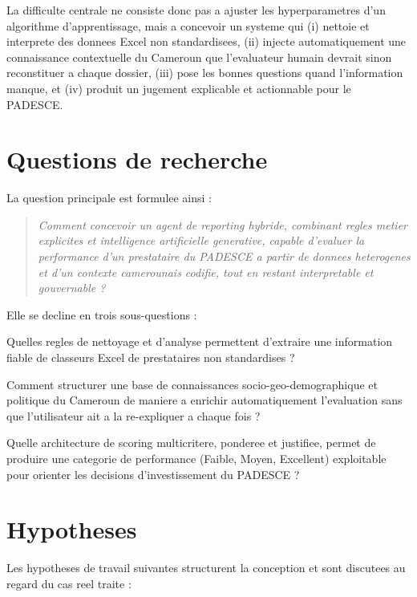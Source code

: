 \documentclass[12pt,a4paper,twoside,openany]{report}
\begin{document}
La difficulte centrale ne consiste donc pas a ajuster les hyperparametres d'un algorithme d'apprentissage, mais a concevoir un systeme qui (i) nettoie et interprete des donnees Excel non standardisees, (ii) injecte automatiquement une connaissance contextuelle du Cameroun que l'evaluateur humain devrait sinon reconstituer a chaque dossier, (iii) pose les bonnes questions quand l'information manque, et (iv) produit un jugement explicable et actionnable pour le PADESCE.

\section*{Questions de recherche}

La question principale est formulee ainsi :

\begin{quote}
\textit{Comment concevoir un agent de reporting hybride, combinant regles metier explicites et intelligence artificielle generative, capable d'evaluer la performance d'un prestataire du PADESCE a partir de donnees heterogenes et d'un contexte camerounais codifie, tout en restant interpretable et gouvernable ?}
\end{quote}

Elle se decline en trois sous-questions :

\begin{description}[leftmargin=1cm]
\item[QR1.] Quelles regles de nettoyage et d'analyse permettent d'extraire une information fiable de classeurs Excel de prestataires non standardises ?
\item[QR2.] Comment structurer une base de connaissances socio-geo-demographique et politique du Cameroun de maniere a enrichir automatiquement l'evaluation sans que l'utilisateur ait a la re-expliquer a chaque fois ?
\item[QR3.] Quelle architecture de scoring multicritere, ponderee et justifiee, permet de produire une categorie de performance (Faible, Moyen, Excellent) exploitable pour orienter les decisions d'investissement du PADESCE ?
\end{description}

\section*{Hypotheses}

Les hypotheses de travail suivantes structurent la conception et sont discutees au regard du cas reel traite :
\end{document}
